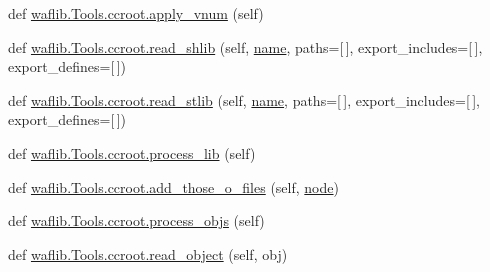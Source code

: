 \begin{DoxyCompactItemize}
\item 
def \hyperlink{namespacewaflib_1_1_tools_1_1ccroot_a6aaa16b9cf69735b21b619635046773f}{waflib.\+Tools.\+ccroot.\+apply\+\_\+vnum} (self)
\item 
def \hyperlink{namespacewaflib_1_1_tools_1_1ccroot_aa6ffb8f918a879780fccf80b04b4e2da}{waflib.\+Tools.\+ccroot.\+read\+\_\+shlib} (self, \hyperlink{lib_2expat_8h_a1b49b495b59f9e73205b69ad1a2965b0}{name}, paths=\mbox{[}$\,$\mbox{]}, export\+\_\+includes=\mbox{[}$\,$\mbox{]}, export\+\_\+defines=\mbox{[}$\,$\mbox{]})
\item 
def \hyperlink{namespacewaflib_1_1_tools_1_1ccroot_a63bb0dcff2ba4649fe2a1c5b38bace1e}{waflib.\+Tools.\+ccroot.\+read\+\_\+stlib} (self, \hyperlink{lib_2expat_8h_a1b49b495b59f9e73205b69ad1a2965b0}{name}, paths=\mbox{[}$\,$\mbox{]}, export\+\_\+includes=\mbox{[}$\,$\mbox{]}, export\+\_\+defines=\mbox{[}$\,$\mbox{]})
\item 
def \hyperlink{namespacewaflib_1_1_tools_1_1ccroot_a0c7dd6dd8e041dce2cadf0354606dfb1}{waflib.\+Tools.\+ccroot.\+process\+\_\+lib} (self)
\item 
def \hyperlink{namespacewaflib_1_1_tools_1_1ccroot_ac7ed38877e335b491b2b8cee2868b0b9}{waflib.\+Tools.\+ccroot.\+add\+\_\+those\+\_\+o\+\_\+files} (self, \hyperlink{structnode}{node})
\item 
def \hyperlink{namespacewaflib_1_1_tools_1_1ccroot_ab1fb77c5a01dd5e4c58184caaf80fcad}{waflib.\+Tools.\+ccroot.\+process\+\_\+objs} (self)
\item 
def \hyperlink{namespacewaflib_1_1_tools_1_1ccroot_a6c9f92ebe00583811ae1e0f9e5040457}{waflib.\+Tools.\+ccroot.\+read\+\_\+object} (self, obj)
\end{DoxyCompactItemize}
